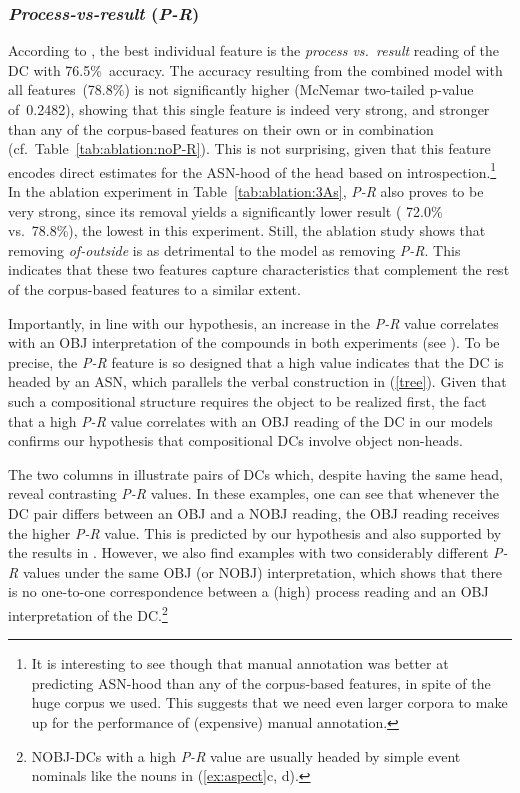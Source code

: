 \documentclass[output=paper]{langsci/langscibook}
\begin{document}
\subsubsection{\textit{Process-vs-result} (\textit{P-R})}\label{sec:discussion-int-P-R}
According to , the best individual feature is the \textit{process vs.\ result} reading of the DC with 76.5\%~accuracy. 
The accuracy resulting from the combined model with all features~(78.8\%) is not significantly higher (McNemar two-tailed p-value of~0.2482), showing that this single feature is indeed very strong, and stronger than any of the corpus-based features on their own or in combination  {(cf.~Table~\ref{tab:ablation:noP-R})}. This is not surprising, given that this feature encodes direct estimates for the ASN-hood of the head based on introspection.\footnote{It is interesting to see though that manual annotation was better at predicting ASN-hood than any of the corpus-based features, in spite of the huge corpus we used. This suggests that we need even larger corpora to make up for the performance of (expensive) manual annotation.} In the ablation experiment  in Table~\ref{tab:ablation:3As}, \textit{P-R} also proves to be very strong, since its removal yields a significantly lower result ( {72.0}\% vs.~78.8\%), the lowest  in this experiment. Still, the ablation study shows that removing \textit{of-outside} is as detrimental to the model as removing \textit{P-R}. This indicates that these two features capture characteristics that complement the rest of the corpus-based features to a similar extent.

Importantly, in line with our hypothesis, an increase in the \textit{P-R} value correlates with an OBJ interpretation of the compounds in both experiments (see  ).  To be precise, the \textit{P-R} feature is so designed that a high value indicates that the DC is headed by an ASN, which parallels  the verbal construction in (\ref{tree}). Given that such a compositional structure requires the object to be realized first, the fact that a high \textit{P-R} value correlates with an OBJ reading of the DC in our models confirms our hypothesis that compositional DCs involve object non-heads.

The two columns in  illustrate pairs of DCs which, despite having the same head, reveal contrasting \textit{P-R} values. In these examples, one can see that whenever the DC pair differs  {between an OBJ and a} NOBJ reading, the OBJ reading receives the higher \textit{P-R} value. This is predicted by our hypothesis and also supported by the results in .
However, we also find examples with two  {considerably} different \textit{P-R} values under the same OBJ (or NOBJ) interpretation, which shows that there is no one-to-one correspondence between a (high) process reading and an OBJ interpretation of the DC.\footnote{ {NOBJ-DCs with a high \textit{P-R} value are usually headed by simple event nominals like the nouns in (\ref{ex:aspect}c, d).}} 
\end{document}
